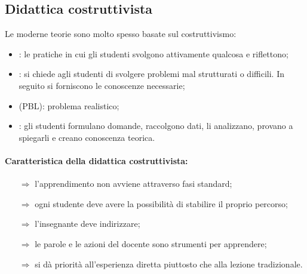 

\subsection{Didattica costruttivista}

Le moderne teorie sono molto spesso basate sul costruttivismo:

\begin{itemize}
    \item {}: le pratiche in cui gli studenti svolgono attivamente qualcosa e riflettono;
    \item {}: si chiede agli studenti di svolgere problemi mal strutturati o difficili. In seguito si forniscono le conoscenze necessarie;
    \item {} (PBL): problema realistico;
    \item {}: gli studenti formulano domande, raccolgono dati, li analizzano, provano a spiegarli e creano conoscenza teorica.
\end{itemize}


\paragraph{Caratteristica della didattica costruttivista:}

\begin{itemize}
    \item[$\Rightarrow$] l'apprendimento non avviene attraverso fasi standard;
    \item[$\Rightarrow$] ogni studente deve avere la possibilità di stabilire il proprio percorso;
    \item[$\Rightarrow$] l'insegnante deve indirizzare;
    \item[$\Rightarrow$] le parole e le azioni del docente sono strumenti per apprendere;
    \item[$\Rightarrow$] si dà priorità all'esperienza diretta piuttosto che alla lezione tradizionale.
\end{itemize}

